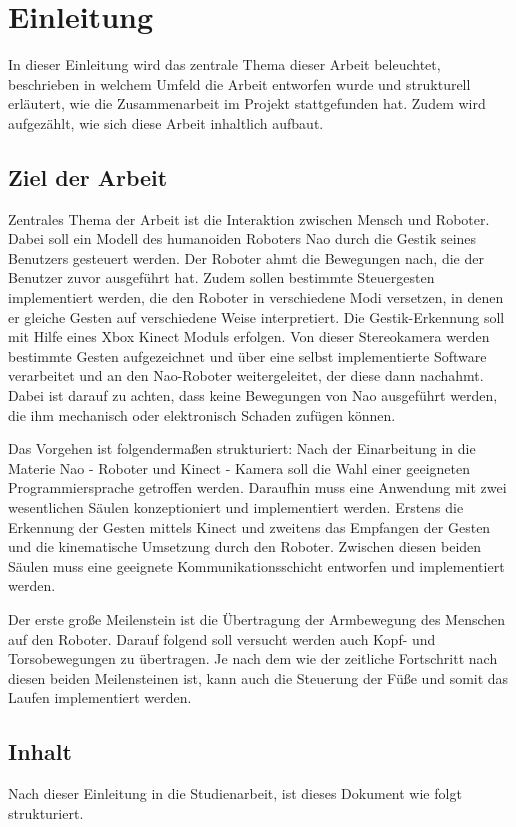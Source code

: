 \chapter{Einleitung}      %
\label{Einleitung}

In dieser Einleitung wird das zentrale Thema dieser Arbeit beleuchtet, beschrieben in welchem Umfeld die Arbeit entworfen wurde und strukturell erläutert, wie die Zusammenarbeit im Projekt stattgefunden hat. Zudem wird aufgezählt, wie sich diese Arbeit inhaltlich aufbaut.

\section{Ziel der Arbeit}
Zentrales Thema der Arbeit ist die Interaktion zwischen Mensch und Roboter. Dabei soll ein Modell des humanoiden Roboters Nao durch die Gestik seines Benutzers gesteuert werden. Der Roboter ahmt die Bewegungen nach, die der Benutzer zuvor ausgeführt hat. Zudem sollen bestimmte Steuergesten implementiert werden, die den Roboter in verschiedene Modi versetzen, in denen er gleiche Gesten auf verschiedene Weise interpretiert. Die Gestik-Erkennung soll mit Hilfe eines Xbox Kinect Moduls erfolgen. Von dieser Stereokamera werden bestimmte Gesten aufgezeichnet und über eine selbst implementierte Software verarbeitet und an den Nao-Roboter weitergeleitet, der diese dann nachahmt. Dabei ist darauf zu achten, dass keine Bewegungen von Nao ausgeführt werden, die ihm mechanisch oder elektronisch Schaden zufügen können.

Das Vorgehen ist folgendermaßen strukturiert: Nach der Einarbeitung in die Materie Nao - Roboter und Kinect - Kamera soll die Wahl einer geeigneten Programmiersprache getroffen werden. Daraufhin muss eine  Anwendung mit zwei wesentlichen Säulen konzeptioniert und implementiert werden. Erstens die Erkennung der Gesten mittels Kinect und zweitens das Empfangen der Gesten und die kinematische Umsetzung durch den Roboter. Zwischen diesen beiden Säulen muss eine geeignete Kommunikationsschicht entworfen und implementiert werden.

Der erste große Meilenstein ist die Übertragung der Armbewegung des Menschen auf den Roboter. Darauf folgend soll versucht werden auch Kopf- und Torsobewegungen zu übertragen. Je nach dem wie der zeitliche Fortschritt nach diesen beiden Meilensteinen ist, kann auch die Steuerung der Füße und somit das Laufen implementiert werden.


\section{Inhalt}
Nach dieser Einleitung in die Studienarbeit, ist dieses Dokument wie folgt strukturiert. 

